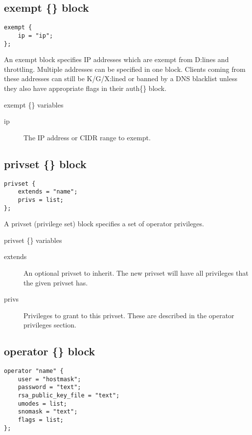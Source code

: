 \subsection{exempt \{\} block}

\begin{verbatim}
exempt {
	ip = "ip";
};\end{verbatim}

	An exempt block specifies IP addresses which are exempt from D:lines
	and throttling. Multiple addresses can be specified in one block.
	Clients coming from these addresses can still be K/G/X:lined or banned
	by a DNS blacklist unless they also have appropriate flags in their
	auth\{\} block.


{\sc exempt \{\} variables}
\nopagebreak

\noindent
\begin{description}
\item[{ip}]
	The IP address or CIDR range to exempt.
\end{description}

\subsection{privset \{\} block}

\begin{verbatim}
privset {
	extends = "name";
	privs = list;
};\end{verbatim}

	A privset (privilege set) block specifies a set of operator privileges.


{\sc privset \{\} variables}
\nopagebreak

\noindent
\begin{description}
\item[{extends}]
	An optional privset to inherit. The new privset will have all privileges that the given privset has.

\item[{privs}]
	Privileges to grant to this privset. These are described in the operator privileges section.
\end{description}


\subsection{operator \{\} block}

\begin{verbatim}
operator "name" {
	user = "hostmask";
	password = "text";
	rsa_public_key_file = "text";
	umodes = list;
	snomask = "text";
	flags = list;
};\end{verbatim}

